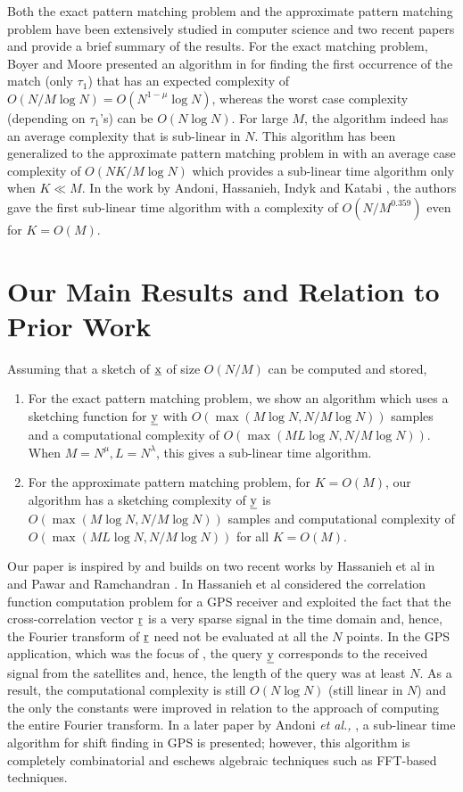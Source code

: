 Both the exact pattern matching problem and the approximate pattern matching problem have been extensively studied in computer science and two recent papers \cite{andoni2013shift} and \cite{amir2004faster} provide a brief summary of the results. For the exact matching problem, Boyer and Moore presented an algorithm in \cite{boyer1977fast} for finding the first occurrence of the match (only $\tau_1$) that has an expected complexity of $O(N/M \log N) = O(N^{1-\mu} \log N)$, whereas the worst case complexity (depending on $\tau_1$'s) can be $O(N \log N)$. For large $M$, the algorithm indeed has an average complexity that is sub-linear in $N$. This algorithm has been generalized to the approximate pattern matching problem in \cite{chang1994approximate} with an average case complexity of $O(NK/M \log N)$ which provides a sub-linear time algorithm only when $K \ll M$. In the work by Andoni, Hassanieh, Indyk and Katabi \cite{andoni2013shift}, the authors gave the first sub-linear time algorithm with a complexity of $O(N/M^{0.359})$ even for $K = O(M)$.

\section{Our Main Results and Relation to Prior Work}
\label{sec:mainresults}
Assuming that a sketch of $\underline{\mathrm{x}}$ of size $O(N/M)$ can be computed and stored,
\begin{enumerate}
  \item For the exact pattern matching problem, we show an algorithm which uses a sketching function for $\underline{\mathrm{y}}$ with $O(\max(M \log N, N/M \log N))$ samples and a computational complexity of $O(\max(ML \log N, N/M \log N))$. When $M = N^\mu, L = N^\lambda$, this gives a sub-linear time algorithm.

  \item For the approximate pattern matching problem, for $K = O(M)$, our algorithm has a sketching complexity of $\underline{\mathrm{y}}$ is $O(\max(M \log N, N/M \log N))$ samples and computational complexity of $O(\max(ML \log N, N/M \log N))$ for all $K = O(M)$.
\end{enumerate}

Our paper is inspired by and builds on two recent works by Hassanieh et al in \cite{hassanieh2012faster} and Pawar and Ramchandran \cite{pawar2014robust}. In \cite{hassanieh2012faster} Hassanieh et al considered the correlation function computation problem for a GPS receiver and exploited the fact that the cross-correlation vector $\underline{\mathrm{r}}$ is a very sparse signal in the time domain and, hence, the Fourier transform of $\underline{\mathrm{r}}$ need not be evaluated at all the $N$ points. In the GPS application, which was the focus of \cite{hassanieh2012faster}, the query $\underline{\mathrm{y}}$ corresponds to the received signal from the satellites and, hence, the length of the query was at least $N$. As a result, the computational complexity is still $O(N \log N)$ (still linear in $N$) and the only the constants were improved in relation to the approach of computing the entire Fourier transform. In a later paper by Andoni {\em et al.,} \cite{andoni2013shift}, a sub-linear time algorithm for shift finding in GPS is presented; however, this algorithm is completely combinatorial and eschews algebraic techniques such as FFT-based techniques.

